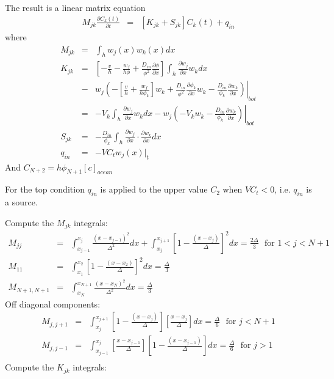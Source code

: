 The result is a linear matrix equation 
\begin{eqnarray}
M_{jk}\frac{\partial C_k(t)}{\partial t} & = & [K_{jk}+S_{jk}] C_k(t) + q_{in}
\end{eqnarray}
where
\begin{eqnarray}
M_{jk} & = & \int_h w_j(x)w_k(x)dx \nonumber \\
K_{jk} & = & \left[-\frac{v}{h} - \frac{w_f}{h\phi}+ \frac{D_{in}}{\phi^2}\frac{\partial
      \phi}{\partial x}\right]\int_h \frac{\partial w_j}{\partial x}
  w_k dx \nonumber \\
&-&
\left. w_j\left(-\left[\frac{v}{h} + \frac{w_f}{h\phi_k}\right]w_k +
    \frac{D_{in}}{\phi^2}\frac{\partial \phi_k}{\partial x} w_k - \frac{D_{in}}{\phi_k}\frac{\partial w_k}{\partial
      x}\right)\right|_{bot} \nonumber \\
& = & -V_k\int_h \frac{\partial w_j}{\partial x} w_k dx -
\left. w_j\left(-V_kw_k - \frac{D_{in}}{\phi_k}\frac{\partial w_k}{\partial
      x}\right)\right|_{bot} \nonumber \\
S_{jk} & = & -\frac{D_{in}}{\phi_k}\int_h \frac{\partial w_j}{\partial x} \cdot
\frac{\partial w_k}{\partial x}dx \nonumber \\
q_{in} & = & -V C_{t} w_j(x)|_{t}
\end{eqnarray}
 And $C_{N+2} = h\phi_{N+1}[c]_{ocean}$

For the top condition $q_{in}$ is applied to the upper value $C_2$
when $VC_t < 0$, i.e. $q_{in}$ is a source. 

Compute the $M_{jk}$ integrals:
\begin{eqnarray}
M_{jj} & = & \int_{x_{j-1}}^{x_j}\frac{(x- x_{j-1})^2}{\Delta^2}dx +
\int_{x_{j}}^{x_{j+1}}\left[ 1-\frac{(x- x_{j})}{\Delta}\right]^2dx =
\frac{2\Delta}{3} \ \ \ \mbox{for }1 < j < N+1 \nonumber \\
M_{11} & = & \int_{x_{1}}^{x_{2}}\left[ 1-\frac{(x- x_{2})}{\Delta}\right]^2dx =
\frac{\Delta}{3}   \nonumber \\
M_{N+1,N+1} & = &\int_{x_{N}}^{x_{N+1}}\frac{(x- x_{N})^2}{\Delta^2}dx
= \frac{\Delta}{3} \nonumber 
\end{eqnarray}
Off diagonal components:
\begin{eqnarray}
M_{j,j+1} & = &  \int_{x_{j}}^{x_{j+1}}\left[1 - \frac{(x-
    x_{j})}{\Delta}\right]\left[ \frac{x-x_{j}}{\Delta}\right]dx =
\frac{\Delta}{6} \ \ \ \mbox{for }j < N+1 \nonumber \\
M_{j,j-1} & = &  \int_{x_{j-1}}^{x_{j}}\left[ \frac{x-x_{j-1}}{\Delta}\right]\left[1 - \frac{(x-
    x_{j-1})}{\Delta}\right]dx =
\frac{\Delta}{6} \ \ \ \mbox{for }j > 1 \nonumber \\
\end{eqnarray}
Compute the $K_{jk}$ integrals:

